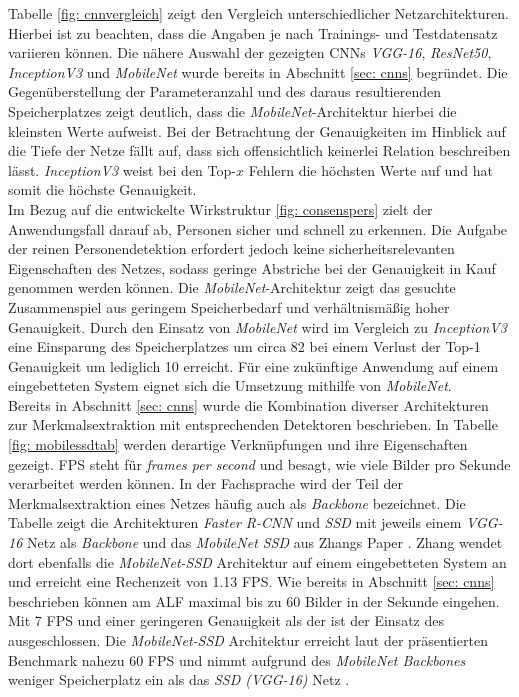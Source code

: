 		
		
			
		
		Tabelle \ref{fig: cnnvergleich} zeigt den Vergleich unterschiedlicher Netzarchitekturen. Hierbei ist zu beachten, dass die Angaben je nach Trainings- und Testdatensatz variieren können. Die nähere Auswahl der gezeigten CNNs \textit{VGG-16}, \textit{ResNet50}, \textit{InceptionV3} und \textit{MobileNet} wurde bereits in Abschnitt \ref{sec: cnns} begründet. Die Gegenüberstellung der Parameteranzahl und des daraus resultierenden Speicherplatzes zeigt deutlich, dass die \textit{MobileNet}-Architektur hierbei die kleinsten Werte aufweist. Bei der Betrachtung der Genauigkeiten im Hinblick auf die Tiefe der Netze fällt auf, dass sich offensichtlich keinerlei Relation beschreiben lässt. \textit{InceptionV3} weist bei den Top-$x$ Fehlern die höchsten Werte auf und hat somit die höchste Genauigkeit.\\
		
		Im Bezug auf die entwickelte Wirkstruktur \ref{fig: consenspers} zielt der Anwendungsfall darauf ab, Personen sicher und schnell zu erkennen. Die Aufgabe der reinen Personendetektion erfordert jedoch keine sicherheitsrelevanten Eigenschaften des Netzes, sodass geringe Abstriche bei der Genauigkeit in Kauf genommen werden können. Die \textit{MobileNet}-Architektur zeigt das gesuchte Zusammenspiel aus geringem Speicherbedarf und verhältnismäßig hoher Genauigkeit. Durch den Einsatz von \textit{MobileNet} wird im Vergleich zu \textit{InceptionV3} eine Einsparung des Speicherplatzes um circa 82 \percent\text{ }bei einem Verlust der Top-1 Genauigkeit um lediglich 10 \percent\textit{ }erreicht. Für eine zukünftige Anwendung auf einem eingebetteten System eignet sich die Umsetzung mithilfe von \textit{MobileNet}.\\
		
		
		
		Bereits in Abschnitt \ref{sec: cnns} wurde die Kombination diverser Architekturen zur Merkmalsextraktion mit entsprechenden Detektoren beschrieben. In Tabelle \ref{fig: mobilessdtab} werden derartige Verknüpfungen und ihre Eigenschaften gezeigt. FPS steht für \textit{frames per second} und besagt, wie viele Bilder pro Sekunde verarbeitet werden können. In der Fachsprache wird der Teil der Merkmalsextraktion eines Netzes häufig auch als \textit{Backbone} bezeichnet. Die Tabelle zeigt die Architekturen \textit{Faster R-CNN} und \textit{SSD} mit jeweils einem \textit{VGG-16} Netz als \textit{Backbone} und das \textit{MobileNet SSD} aus Zhangs Paper \cite{embedded}. Zhang wendet dort ebenfalls die \textit{MobileNet-SSD} Architektur auf einem eingebetteten System an und erreicht eine Rechenzeit von 1.13 FPS. Wie bereits in Abschnitt \ref{sec: cnns} beschrieben können am ALF maximal bis zu 60 Bilder in der Sekunde eingehen. Mit 7 FPS und einer geringeren Genauigkeit als der  ist der Einsatz des  ausgeschlossen. Die \textit{MobileNet-SSD} Architektur erreicht laut der präsentierten Benchmark nahezu 60 FPS und nimmt aufgrund des \textit{MobileNet Backbones} weniger Speicherplatz ein als das \textit{SSD (VGG-16)} Netz \cite{leightweight}. \\ 
		
